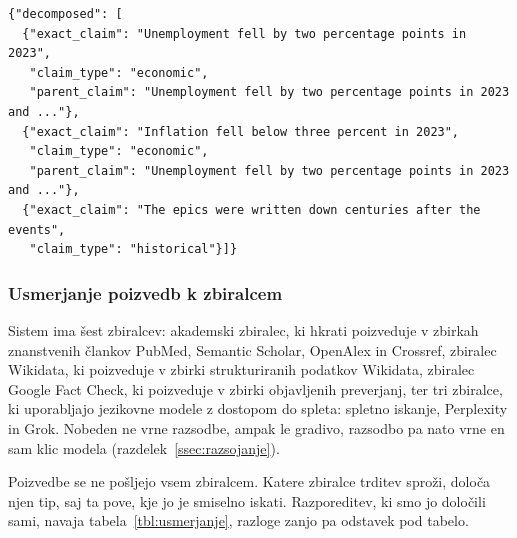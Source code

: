 \documentclass[a4paper, 12pt]{book}
\begin{document}
\begin{lstlisting}[basicstyle=\ttfamily\scriptsize,breaklines=true]
{"decomposed": [
  {"exact_claim": "Unemployment fell by two percentage points in 2023",
   "claim_type": "economic",
   "parent_claim": "Unemployment fell by two percentage points in 2023 and ..."},
  {"exact_claim": "Inflation fell below three percent in 2023",
   "claim_type": "economic",
   "parent_claim": "Unemployment fell by two percentage points in 2023 and ..."},
  {"exact_claim": "The epics were written down centuries after the events",
   "claim_type": "historical"}]}
\end{lstlisting}

\subsubsection{Usmerjanje poizvedb k zbiralcem}
\label{ssec:engine-routing}

Sistem ima šest zbiralcev: akademski zbiralec, ki hkrati poizveduje v zbirkah znanstvenih člankov PubMed, Semantic Scholar, OpenAlex in Crossref, zbiralec Wikidata, ki poizveduje v zbirki strukturiranih podatkov Wikidata, zbiralec Google Fact Check, ki poizveduje v zbirki objavljenih preverjanj, ter tri zbiralce, ki uporabljajo jezikovne modele z dostopom do spleta: spletno iskanje, Perplexity in Grok. Nobeden ne vrne razsodbe, ampak le gradivo, razsodbo pa nato vrne en sam klic modela (razdelek~\ref{ssec:razsojanje}).

Poizvedbe se ne pošljejo vsem zbiralcem. Katere zbiralce trditev sproži, določa njen tip, saj ta pove, kje jo je smiselno iskati. Razporeditev, ki smo jo določili sami, navaja tabela~\ref{tbl:usmerjanje}, razloge zanjo pa odstavek pod tabelo.
\end{document}

